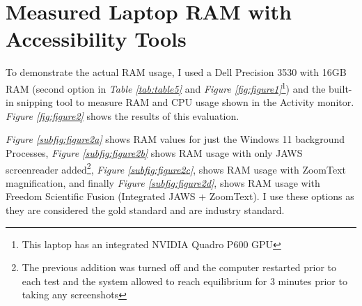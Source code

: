 \pagebreak\hypertarget{laptop-RAM-use}{}\section{Measured Laptop RAM with Accessibility Tools}\label{laptop-RAM-use}
To demonstrate the actual RAM usage, I used a Dell Precision 3530 with 16GB RAM (second option in \textit{Table \ref{tab:table5}} and \textit{Figure \ref{fig:figure1}}\footnote{\raggedright This laptop has an integrated NVIDIA Quadro P600 GPU}) and the built-in snipping tool to measure RAM and CPU usage shown in the Activity monitor. \textit{Figure \ref{fig:figure2}} shows the results of this evaluation.

\textit{Figure \ref{subfig:figure2a}} shows RAM values for just the Windows 11 background Processes, \textit{Figure \ref{subfig:figure2b}} shows RAM usage with only JAWS screenreader added\footnote{\raggedright The previous addition was turned off and the computer restarted prior to each test and the system allowed to reach equilibrium for 3 minutes prior to taking any screenshots}, \textit{Figure \ref{subfig:figure2c}}, shows RAM usage with ZoomText magnification, and finally \textit{Figure \ref{subfig:figure2d}}, shows RAM usage with Freedom Scientific Fusion (Integrated JAWS + ZoomText). I use these options as they are considered the gold standard and are industry standard.

